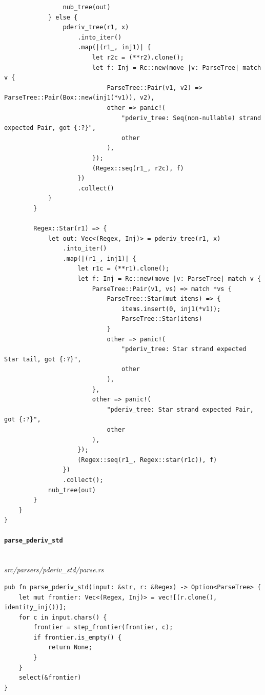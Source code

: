 {\begin{verbatim}
                nub_tree(out)
            } else {
                pderiv_tree(r1, x)
                    .into_iter()
                    .map(|(r1_, inj1)| {
                        let r2c = (**r2).clone();
                        let f: Inj = Rc::new(move |v: ParseTree| match v {
                            ParseTree::Pair(v1, v2) => ParseTree::Pair(Box::new(inj1(*v1)), v2),
                            other => panic!(
                                "pderiv_tree: Seq(non-nullable) strand expected Pair, got {:?}",
                                other
                            ),
                        });
                        (Regex::seq(r1_, r2c), f)
                    })
                    .collect()
            }
        }

        Regex::Star(r1) => {
            let out: Vec<(Regex, Inj)> = pderiv_tree(r1, x)
                .into_iter()
                .map(|(r1_, inj1)| {
                    let r1c = (**r1).clone();
                    let f: Inj = Rc::new(move |v: ParseTree| match v {
                        ParseTree::Pair(v1, vs) => match *vs {
                            ParseTree::Star(mut items) => {
                                items.insert(0, inj1(*v1));
                                ParseTree::Star(items)
                            }
                            other => panic!(
                                "pderiv_tree: Star strand expected Star tail, got {:?}",
                                other
                            ),
                        },
                        other => panic!(
                            "pderiv_tree: Star strand expected Pair, got {:?}",
                            other
                        ),
                    });
                    (Regex::seq(r1_, Regex::star(r1c)), f)
                })
                .collect();
            nub_tree(out)
        }
    }
}
\end{verbatim}}

\paragraph{\texttt{parse\_pderiv\_std}}\ \\[-0.4em]
\textit{\small src/parsers/pderiv\_std/parse.rs}
{\scriptsize\begin{verbatim}
pub fn parse_pderiv_std(input: &str, r: &Regex) -> Option<ParseTree> {
    let mut frontier: Vec<(Regex, Inj)> = vec![(r.clone(), identity_inj())];
    for c in input.chars() {
        frontier = step_frontier(frontier, c);
        if frontier.is_empty() {
            return None;
        }
    }
    select(&frontier)
}
\end{verbatim}}

